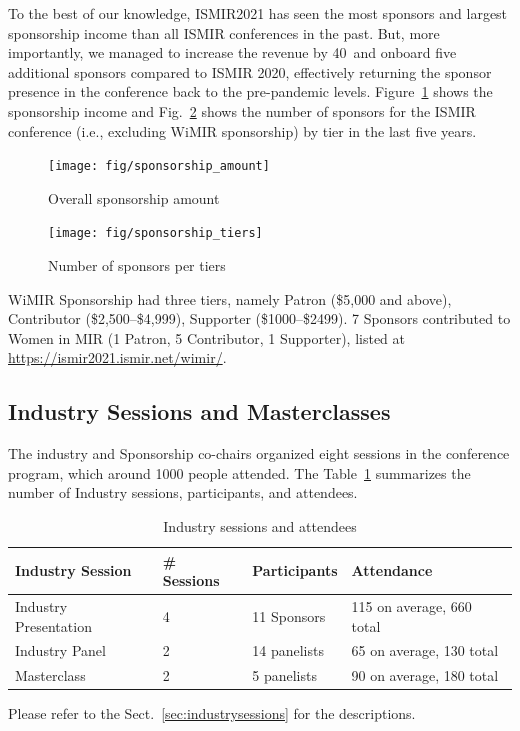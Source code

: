 \documentclass[%
10pt,								%
titlepage,						%
]
{scrartcl}
\begin{document}
        To the best of our knowledge, ISMIR2021 has seen the most sponsors and largest sponsorship income than all ISMIR conferences in the past. But, more importantly, we managed to increase the revenue by 40\ and onboard five additional sponsors compared to ISMIR 2020, effectively returning the sponsor presence in the conference back to the pre-pandemic levels. Figure~\ref{fig:sponsorship_amount} shows the sponsorship income and Fig.~\ref{fig:sponsorship_tiers} shows the number of sponsors for the ISMIR conference (i.e., excluding WiMIR sponsorship) by tier in the last five years.  
        \begin{figure}%
            \centering
            \texttt{[image: fig/sponsorship\_amount]}%
            \caption{Overall sponsorship amount}%
            \label{fig:sponsorship_amount}%
        \end{figure}
        \begin{figure}%
            \centering
            \texttt{[image: fig/sponsorship\_tiers]}%
            \caption{Number of sponsors per tiers}%
            \label{fig:sponsorship_tiers}%
        \end{figure}
        
        WiMIR Sponsorship had three tiers, namely Patron (\$5,000 and above), Contributor (\$2,500--\$4,999), Supporter (\$1000--\$2499). 7 Sponsors contributed to Women in MIR (1 Patron, 5 Contributor, 1 Supporter), listed at \href{https://ismir2021.ismir.net/wimir/}{https://ismir2021.ismir.net/wimir/}. 
        
        
    \subsection{Industry Sessions and Masterclasses}
        The industry and Sponsorship co-chairs organized eight sessions in the conference program, which around 1000 people attended. The Table~\ref{tab:IndustrySessions} summarizes the number of Industry sessions, participants, and attendees. 
        
        
        \begin{table}
            \centering
            \begin{tabular}{l|l|l|l}
                \textbf{Industry Session} & \textbf{\# Sessions} & \textbf{Participants} & \textbf{Attendance}\\ \hline
                
                Industry Presentation & 4 & 11 Sponsors & 115 on average, 660 total\\
                Industry Panel & 2 & 14 panelists & 65 on average, 130 total\\
                Masterclass & 2 & 5 panelists & 90 on average, 180 total\\
            
            \end{tabular}
            \caption{Industry sessions and attendees}
            \label{tab:IndustrySessions}
        \end{table}
        Please refer to the Sect.~\ref{sec:industrysessions} for the descriptions.
        
\end{document}
